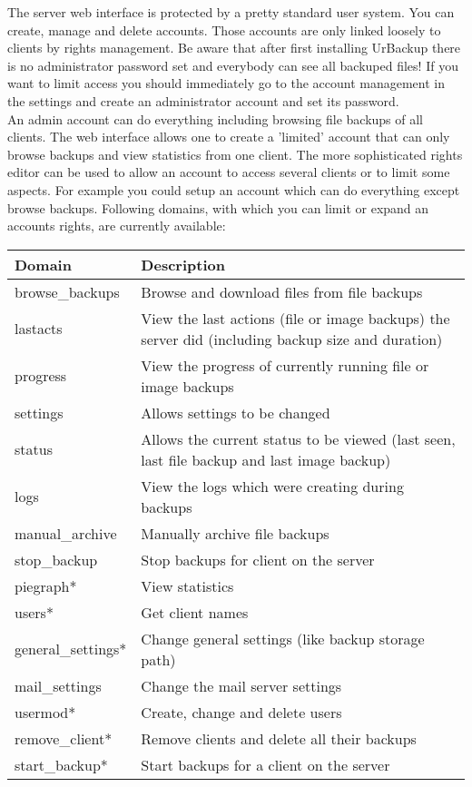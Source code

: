 \documentclass[a4paper,10pt]{article} \usepackage[breaklinks=true]{hyperref}
\begin{document}
The server web interface is protected by a pretty standard user system. You can
create, manage and delete accounts. Those accounts are only linked loosely to
clients by rights management. Be aware that after first installing UrBackup
there is no administrator password set and everybody can see all backuped files!
If you want to limit access you should immediately go to the account management
in the settings and create an administrator account and set its password.\\
An admin account can do everything including browsing file backups of all
clients. The web interface allows one to create a 'limited' account that can only
browse backups and view statistics from one client. The more sophisticated
rights editor can be used to allow an account to access several clients or to
limit some aspects. For example you could setup an account which can do
everything except browse backups.
Following domains, with which you can limit or expand an accounts rights, are
currently available:

\begin{tabular}{|l|p{}|}
\hline
Domain  & Description \\
\hline\hline
browse\_backups & Browse and download files from file backups\\
lastacts & View the last actions (file or image backups) the server did (including backup size and duration)\\
progress & View the progress of currently running file or image backups\\
settings & Allows settings to be changed\\
status & Allows the current status to be viewed (last seen, last file backup and last image backup)\\
logs & View the logs which were creating during backups\\
manual\_archive & Manually archive file backups\\
stop\_backup & Stop backups for client on the server\\
piegraph* & View statistics\\
users* & Get client names\\
general\_settings* & Change general settings (like backup storage path)\\
mail\_settings & Change the mail server settings \\
usermod* & Create, change and delete users\\
remove\_client* & Remove clients and delete all their backups\\
start\_backup* & Start backups for a client on the server\\

\hline
\end{tabular}
\end{document}
